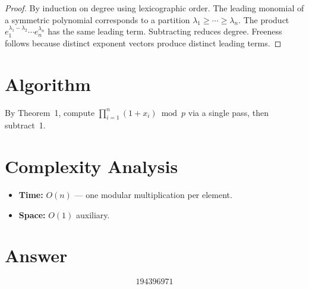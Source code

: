 \documentclass[11pt]{article}
\begin{document}
\begin{proof}
By induction on degree using lexicographic order. The leading monomial of a symmetric polynomial corresponds to a partition $\lambda_1\ge\cdots\ge\lambda_n$. The product $e_1^{\lambda_1-\lambda_2}\cdots e_n^{\lambda_n}$ has the same leading term. Subtracting reduces degree. Freeness follows because distinct exponent vectors produce distinct leading terms.
\end{proof}

\section{Algorithm}

By Theorem~1, compute $\prod_{i=1}^{n}(1+x_i)\bmod p$ via a single pass, then subtract~1.

\section{Complexity Analysis}

\begin{itemize}
\item \textbf{Time:} $O(n)$ --- one modular multiplication per element.
\item \textbf{Space:} $O(1)$ auxiliary.
\end{itemize}

\section{Answer}

\[
\boxed{194396971}
\]
\end{document}
